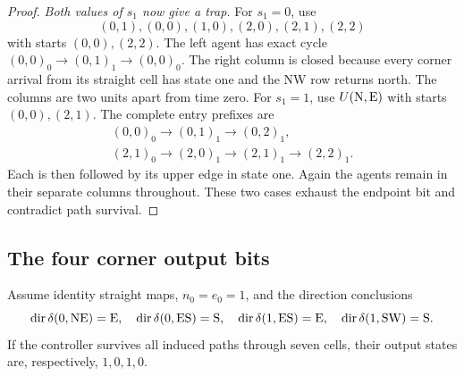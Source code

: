 \begin{proof}
\emph{Both values of $s_1$ now give a trap.}
For $s_1=0$, use
\[
(0,1),(0,0),(1,0),(2,0),(2,1),(2,2)
\]
with starts $(0,0),(2,2)$. The left agent has exact cycle
$(0,0)_0\to(0,1)_1\to(0,0)_0$.
The right column is closed because every corner arrival from
its straight cell has state one and the NW row returns north.
The columns are two units apart from time zero.
For $s_1=1$, use $U(\mathrm{N},\mathrm{E})$ with starts $(0,0),(2,1)$.
The complete entry prefixes are
\[
\begin{array}{l}
(0,0)_0\to(0,1)_1\to(0,2)_1,\\
(2,1)_0\to(2,0)_1\to(2,1)_1\to(2,2)_1.
\end{array}
\]
Each is then followed by its upper edge in state one. Again the
agents remain in their separate columns throughout. These two
cases exhaust the endpoint bit and contradict path survival.
\end{proof}

\subsection{The four corner output bits}\label{u:appendix-bits}

\begin{lemma}\label{u:bit-laws}
Assume identity straight maps, $n_0=e_0=1$, and the direction
conclusions
\[
\operatorname{dir}\delta(0,\mathrm{NE})=\mathrm{E},\quad
\operatorname{dir}\delta(0,\mathrm{ES})=\mathrm{S},\quad
\operatorname{dir}\delta(1,\mathrm{ES})=\mathrm{E},\quad
\operatorname{dir}\delta(1,\mathrm{SW})=\mathrm{S}.
\]
If the controller survives all induced paths through seven cells,
their output states are, respectively, $1,0,1,0$.
\end{lemma}

